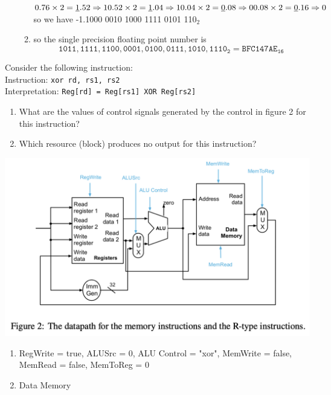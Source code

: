 \documentclass[12pt, a4paper]{article}
\begin{document}
\begin{ans}
\begin{enumerate}
\begin{enumerate}
\begin{math}
                        0.76 \times 2 = \underline{1}.52 \Rightarrow 1\\
                        0.52 \times 2 = \underline{1}.04 \Rightarrow 1 \hfill
                        0.04 \times 2 = \underline{0}.08 \Rightarrow 0 \hfill
                        0.08 \times 2 = \underline{0}.16 \Rightarrow 0
                    \end{math}\\
                    so we have -1.1000 0010 1000 1111 0101 110$_2$
                \item so the single precision floating point number is $$\mathtt{1 011,1111,1 100,0001,0100,0111,1010,1110_2 = BFC147AE_{16}}$$
            \end{enumerate}
    \end{enumerate}
\end{ans}
\pagebreak
\begin{q}{10}
Consider the following instruction:\\
Instruction: \texttt{xor rd, rs1, rs2}\\
Interpretation: \texttt{Reg[rd] = Reg[rs1] XOR Reg[rs2]}
\begin{enumerate}
    \item What are the values of control signals generated by the control in figure 2 for this
    instruction?
    \item Which resource (block) produces no output for this instruction?
\end{enumerate}
\begin{center}
    \includegraphics[scale=0.65]{q3.png}
\end{center}
\end{q}
\begin{ans}
    \begin{enumerate}
        \item RegWrite = true, ALUSrc = 0, ALU Control = "xor", MemWrite = false, \\MemRead = false, MemToReg = 0 
        \item Data Memory
    \end{enumerate}
\end{ans}
\end{document}
